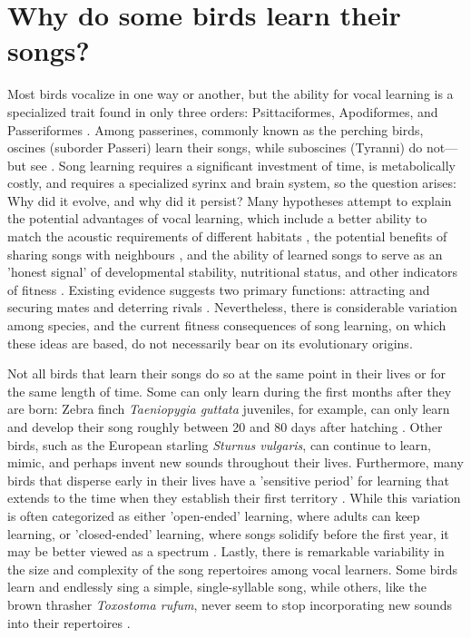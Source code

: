 \section{Why do some birds learn their songs?}
Most birds vocalize in one way or another, but the ability for vocal learning is a specialized trait found in only three orders: Psittaciformes, Apodiformes, and Passeriformes \autocite{kroodsma2004,packert2018}. Among passerines, commonly known as the perching birds, oscines (suborder Passeri) learn their songs, while suboscines (Tyranni) do not---but see \cite{searcy2021,tencate2021}. Song learning requires a significant investment of time, is metabolically costly, and requires a specialized syrinx and brain system, so the question arises: Why did it evolve, and why did it persist? Many hypotheses attempt to explain the potential advantages of vocal learning, which include a better ability to match the acoustic requirements of different habitats \autocite{hansen1979,rios-chelen2012}, the potential benefits of sharing songs with neighbours \autocite{payne1982}, and the ability of learned songs to serve as an 'honest signal' of developmental stability, nutritional status, and other indicators of fitness \autocite{Nowicki2002,ritchie2008}. Existing evidence suggests two primary functions: attracting and securing mates and deterring rivals \autocite{collins2004}. Nevertheless, there is considerable variation among species, and the current fitness consequences of song learning, on which these ideas are based, do not necessarily bear on its evolutionary origins.

Not all birds that learn their songs do so at the same point in their lives or for the same length of time. Some can only learn during the first months after they are born: Zebra finch \textit{Taeniopygia guttata} juveniles, for example, can only learn and develop their song roughly between 20 and 80 days after hatching \autocite{liu2004}. Other birds, such as the European starling \textit{Sturnus vulgaris},  can continue to learn, mimic, and perhaps invent new sounds throughout their lives. Furthermore, many birds that disperse early in their lives have a 'sensitive period' for learning that extends to the time when they establish their first territory \autocite{beecher2005,liu2004}. While this variation is often categorized as either 'open-ended' learning, where adults can keep learning, or 'closed-ended' learning, where songs solidify before the first year, it may be better viewed as a spectrum \autocite{brenowitz2005}. Lastly, there is remarkable variability in the size and complexity of the song repertoires among vocal learners. Some birds learn and endlessly sing a simple, single-syllable song, while others, like the brown thrasher \textit{Toxostoma rufum}, never seem to stop incorporating new sounds into their repertoires \autocite{Boughey1981}.

